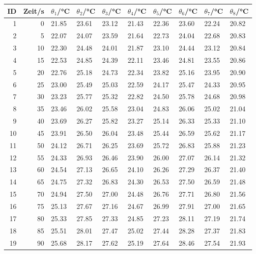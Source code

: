 \begin{longtable}{rrllllllll}%
	\hline
	{ID}&{Zeit/\si{\second}} &{$\theta_{1}$/\si{\degreeCelsius}}&{$\theta_{2}$/\si{\degreeCelsius}}&{$\theta_{3}$/\si{\degreeCelsius}}&{$\theta_{4}$/\si{\degreeCelsius}}&{$\theta_{5}$/\si{\degreeCelsius}}&{$\theta_{6}$/\si{\degreeCelsius}}&{$\theta_{7}$/\si{\degreeCelsius}}&{$\theta_{8}$/\si{\degreeCelsius}}\\
	\hline
	\endhead
1 & 0 & 21.85 & 23.61 & 23.12 & 21.43 & 22.36 & 23.60 & 22.24 & 20.82 \\ 
2 & 5 & 22.07 & 24.07 & 23.59 & 21.64 & 22.73 & 24.04 & 22.68 & 20.83 \\ 
3 & 10 & 22.30 & 24.48 & 24.01 & 21.87 & 23.10 & 24.44 & 23.12 & 20.84 \\ 
4 & 15 & 22.53 & 24.85 & 24.39 & 22.11 & 23.46 & 24.81 & 23.55 & 20.86 \\ 
5 & 20 & 22.76 & 25.18 & 24.73 & 22.34 & 23.82 & 25.16 & 23.95 & 20.90 \\ 
6 & 25 & 23.00 & 25.49 & 25.03 & 22.59 & 24.17 & 25.47 & 24.33 & 20.95 \\ 
7 & 30 & 23.23 & 25.77 & 25.32 & 22.82 & 24.50 & 25.78 & 24.68 & 20.98 \\ 
8 & 35 & 23.46 & 26.02 & 25.58 & 23.04 & 24.83 & 26.06 & 25.02 & 21.04 \\ 
9 & 40 & 23.69 & 26.27 & 25.82 & 23.27 & 25.14 & 26.33 & 25.33 & 21.10 \\ 
10 & 45 & 23.91 & 26.50 & 26.04 & 23.48 & 25.44 & 26.59 & 25.62 & 21.17 \\ 
11 & 50 & 24.12 & 26.71 & 26.25 & 23.69 & 25.72 & 26.83 & 25.88 & 21.23 \\ 
12 & 55 & 24.33 & 26.93 & 26.46 & 23.90 & 26.00 & 27.07 & 26.14 & 21.32 \\ 
13 & 60 & 24.54 & 27.13 & 26.65 & 24.10 & 26.26 & 27.29 & 26.37 & 21.40 \\ 
14 & 65 & 24.75 & 27.32 & 26.83 & 24.30 & 26.53 & 27.50 & 26.59 & 21.48 \\ 
15 & 70 & 24.94 & 27.50 & 27.00 & 24.48 & 26.76 & 27.71 & 26.80 & 21.56 \\ 
16 & 75 & 25.13 & 27.67 & 27.16 & 24.67 & 26.99 & 27.91 & 27.00 & 21.65 \\ 
17 & 80 & 25.33 & 27.85 & 27.33 & 24.85 & 27.23 & 28.11 & 27.19 & 21.74 \\ 
18 & 85 & 25.51 & 28.01 & 27.47 & 25.02 & 27.44 & 28.28 & 27.37 & 21.83 \\ 
19 & 90 & 25.68 & 28.17 & 27.62 & 25.19 & 27.64 & 28.46 & 27.54 & 21.93 \\ 

\end{longtable}
